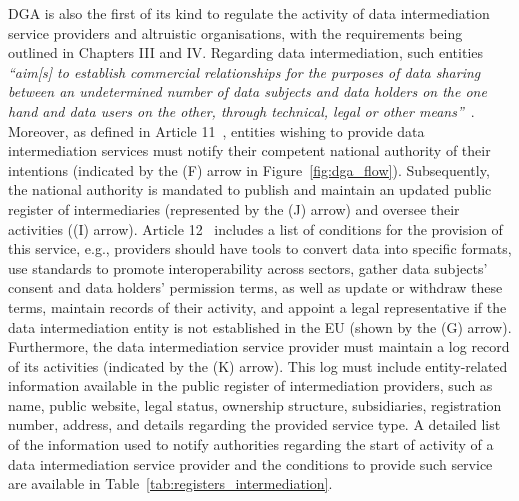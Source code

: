 DGA is also the first of its kind to regulate the activity of data intermediation service providers and altruistic organisations, with the requirements being outlined in Chapters III and IV.
Regarding data intermediation, such entities \textit{``aim[s] to establish commercial relationships for the purposes of data sharing between an undetermined number of data subjects and data holders on the one hand and data users on the other, through technical, legal or other means''}~\citeyearpar{noauthor_regulation_2022}.
Moreover, as defined in Article 11~\citeyearpar{noauthor_regulation_2022}, entities wishing to provide data intermediation services must notify their competent national authority of their intentions (indicated by the (F) arrow in Figure~\ref{fig:dga_flow}).
Subsequently, the national authority is mandated to publish and maintain an updated public register of intermediaries (represented by the (J) arrow) and oversee their activities ((I) arrow).
Article 12~\citeyearpar{noauthor_regulation_2022} includes a list of conditions for the provision of this service, e.g., providers should have tools to convert data into specific formats, use standards to promote interoperability across sectors, gather data subjects' consent and data holders' permission terms, as well as update or withdraw these terms, maintain records of their activity, and appoint a legal representative if the data intermediation entity is not established in the EU (shown by the (G) arrow).
Furthermore, the data intermediation service provider must maintain a log record of its activities (indicated by the (K) arrow).
This log must include entity-related information available in the public register of intermediation providers, such as name, public website, legal status, ownership structure, subsidiaries, registration number, address, and details regarding the provided service type.
A detailed list of the information used to notify authorities regarding the start of activity of a data intermediation service provider and the conditions to provide such service are available in Table~\ref{tab:registers_intermediation}.

